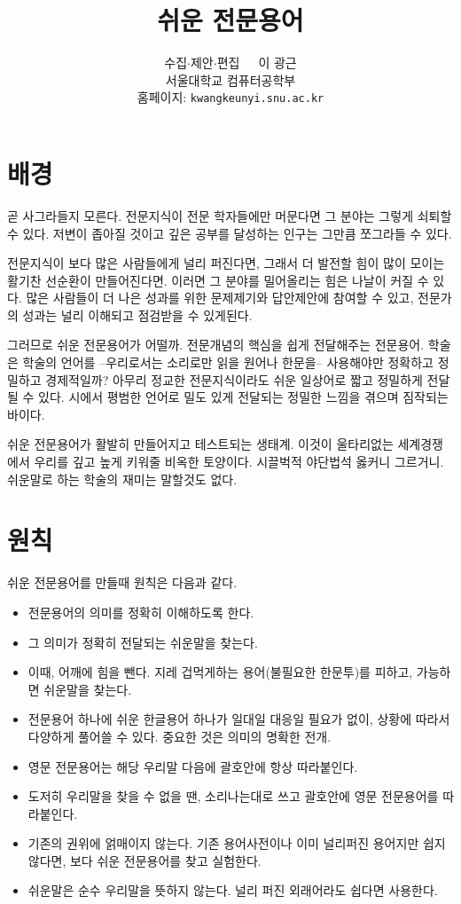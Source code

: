 \documentclass[11pt]{article}
\title{쉬운 전문용어}
\author{수집\(\cdot\)제안\(\cdot\)편집\ \ \  이 광근\\
  서울대학교 컴퓨터공학부\\
  홈페이지: \texttt{kwangkeunyi.snu.ac.kr}
}
\date{}
\begin{document}
\maketitle

\section*{배경}
곧 사그라들지 모른다. 전문지식이 전문 학자들에만 머문다면 그 분야는
그렇게 쇠퇴할 수 있다. 저변이 좁아질 것이고 깊은 공부를 달성하는 인구는
그만큼 쪼그라들 수 있다. 

전문지식이 보다 많은 사람들에게 널리 퍼진다면, 그래서 더 발전할
힘이 많이 모이는 활기찬 선순환이 만들어진다면. 이러면 그 분야를
밀어올리는 힘은 나날이 커질 수 있다. 많은 사람들이 더 나은 성과를 위한
문제제기와 답안제안에 참여할 수 있고, 전문가의 성과는 널리 이해되고
점검받을 수 있게된다.

그러므로 쉬운 전문용어가 어떨까. 전문개념의 핵심을 쉽게 전달해주는
전문용어. 학술은 학술의 언어를 --우리로서는 소리로만 읽을 원어나
한문을-- 사용해야만 정확하고 정밀하고 경제적일까? 아무리 정교한
전문지식이라도 쉬운 일상어로 짧고 정밀하게 전달될 수 있다. 시에서
평범한 언어로 밀도 있게 전달되는 정밀한 느낌을 겪으며 짐작되는 바이다.

쉬운 전문용어가 활발히 만들어지고 테스트되는 생태계.
이것이 울타리없는 세계경쟁에서 우리를 깊고 높게 키워줄 비옥한
토양이다. 시끌벅적 야단법석 옳커니 그르거니. 쉬운말로 하는 학술의 재미는
말할것도 없다.

\section*{원칙}
쉬운 전문용어를 만들때 원칙은 다음과 같다.
\begin{itemize}
\item 전문용어의 의미를 정확히 이해하도록 한다.
\item 그 의미가 정확히 전달되는 쉬운말을 찾는다.
\item 이때, 어깨에 힘을 뺀다. 지레 겁먹게하는 용어(불필요한 한문투)를
  피하고, 가능하면 쉬운말을 찾는다.
\item 전문용어 하나에 쉬운 한글용어 하나가 일대일 대응일 필요가 없이,
  상황에 따라서 다양하게 풀어쓸 수 있다. 중요한 것은 의미의 명확한
  전개.
\item 영문 전문용어는 해당 우리말 다음에 괄호안에 항상 따라붙인다.
\item 도저히 우리말을 찾을 수 없을 땐, 소리나는대로 쓰고 괄호안에 영문
  전문용어를 따라붙인다.
\item 기존의 권위에 얽매이지 않는다. 기존 용어사전이나 이미 널리퍼진
  용어지만 쉽지않다면, 보다 쉬운 전문용어를 찾고 실험한다.
\item 쉬운말은 순수 우리말을 뜻하지 않는다. 널리 퍼진 외래어라도
  쉽다면 사용한다.
\end{itemize}



\printindex
\end{document}
